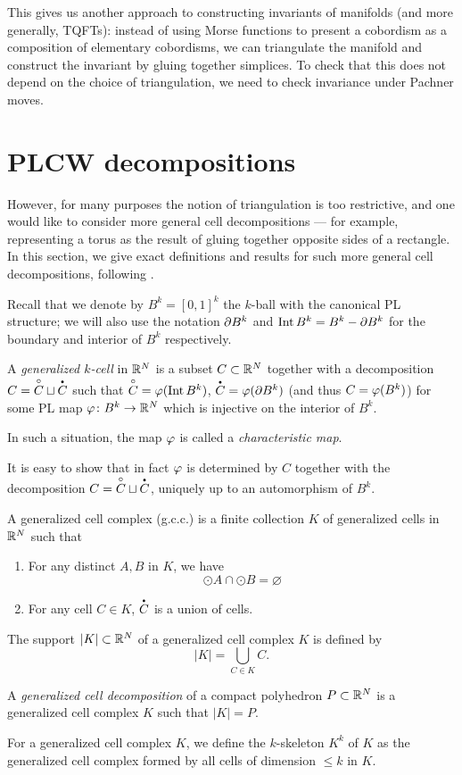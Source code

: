 This gives us another approach to constructing invariants of manifolds (and more
generally, TQFTs): instead of using Morse functions to present a cobordism as a
composition of elementary cobordisms, we can triangulate the manifold and
construct the invariant by gluing together simplices. To check that this does
not depend on the choice of triangulation, we need to check invariance under
Pachner moves.

\section{PLCW decompositions}\label{s:PLCW}
However, for many purposes the notion of triangulation is too restrictive, and
one would like to consider more general cell decompositions --- for example,
representing a torus as the result of gluing together opposite sides of a
rectangle. In this section, we give exact definitions and results for such more
general cell decompositions, following .

Recall that we denote by $B^k=[0,1]^k$ the $k$-ball with the canonical PL
structure; we will also use the notation $\partial B^k$ and $\operatorname{Int} B^k= B^k - \partial
B^k$ for the boundary and interior of $B^k$ respectively.


\begin{definition}\label{d:gen-cell}
A \emph{generalized $k$-cell} in $\mathbb{R}^N$ is a subset $C\subset \mathbb{R}^N$ together
with a decomposition $C=\overset{\circ}{C}\sqcup \overset{\text{\bf\Large .}}{C}$ such that $\overset{\circ}{C}=\varphi(\operatorname{Int}
B^k)$, $\overset{\text{\bf\Large .}}{C}=\varphi(\partial B^k)$ (and thus $C=\varphi(B^k)$) for some PL map
$\varphi\colon B^k\to \mathbb{R}^N$ which is injective on the interior of $B^k$.

In such a situation, the map $\varphi$ is called a \emph{characteristic map}.
\end{definition} It is easy to show that in fact $\varphi$ is determined by $C$
together with the decomposition $C=\overset{\circ}{C}\sqcup \overset{\text{\bf\Large .}}{C}$, uniquely up to an
automorphism of $B^k$.

\begin{definition}\label{d:gen-complex}
  A generalized cell complex (g.c.c.) is a finite collection $K$ of
  generalized cells in $\mathbb{R}^N$ such that
  \begin{enumerate}
    \item For any distinct $A, B$ in $K$, we have
      $$
        \odot{A}\cap \odot{B}=\varnothing
      $$
    \item For any cell $C\in K$, $\overset{\text{\bf\Large .}}{C}$ is a union of cells.
  \end{enumerate}

  The support $|K|\subset \mathbb{R}^N$ of a generalized cell complex $K$ is defined by
  $$
    |K|=\bigcup_{C\in K}C.
  $$

  A \emph{generalized cell decomposition}
  of a compact polyhedron $P\subset \mathbb{R}^N$ is a generalized cell complex $K$ such
  that $|K|=P$.

  For a generalized cell complex $K$, we define the $k$-skeleton $K^k$ of
  $K$ as the generalized cell complex formed by all cells of dimension
  $\le k$ in $K$.
\end{definition}

